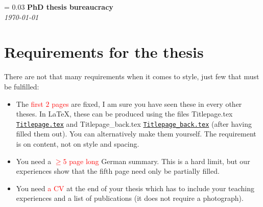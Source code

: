 \documentclass[a4paper]{article}
\newlength{\titleVerticalSpacing}
\newcommand{\myTitle}[2]{%
    \begingroup
        \titleVerticalSpacing = 0.03\textheight
        \centering
        \vspace*{\titleVerticalSpacing}
        {\Huge\bfseries #1}\\[\baselineskip]
        {\itshape #2}\\[3\baselineskip]
    \endgroup
}
\newcommand{\attention}[1]{\textcolor{red}{#1}}
\newcommand{\file}[2][]{%
    \ifthenelse{\isempty{#1}}%
        {\textcolor{fileColor}{#2}}%
        {\href{run:#1}{\texttt{\textcolor{fileColor}{#2}}}}%
}
\begin{document}
    
    \myTitle{PhD thesis bureaucracy}{\monthyeardate\today}

    \section*{Requirements for the thesis}
        There are not that many requirements when it comes to style, just few that must be fulfilled:
        \begin{itemize}
            \item The \attention{first $2$ pages} are fixed, I am sure you have seen these in every other theses.
                  In \LaTeX, these can be produced using the files \file{Titlepage.tex} and \file{Titlepage\_back.tex} (after having filled them out).
                  You can alternatively make them yourself. The requirement is on content, not on style and spacing.
            \item You need a \attention{$\geq 5$ page long} German summary. This is a hard limit, but our experiences show that the fifth page need
              only be partially filled.
            \item You need \attention{a CV} at the end of your thesis which has to include your teaching experiences and a list of publications
              (it does not require a photograph).
        \end{itemize}
        
        
\end{document}
